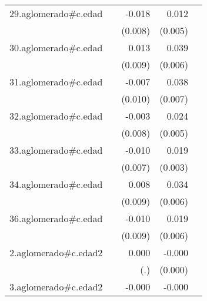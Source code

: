 {\begin{longtable}{l*{4}{D{.}{.}{-1}}}
\addlinespace
29.aglomerado#c.edad&                     &      -0.018\sym{*}  &       0.012\sym{*}  &                     \\
            &                     &     (0.008)         &     (0.005)         &                     \\
\addlinespace
30.aglomerado#c.edad&                     &       0.013         &       0.039\sym{***}&                     \\
            &                     &     (0.009)         &     (0.006)         &                     \\
\addlinespace
31.aglomerado#c.edad&                     &      -0.007         &       0.038\sym{***}&                     \\
            &                     &     (0.010)         &     (0.007)         &                     \\
\addlinespace
32.aglomerado#c.edad&                     &      -0.003         &       0.024\sym{***}&                     \\
            &                     &     (0.008)         &     (0.005)         &                     \\
\addlinespace
33.aglomerado#c.edad&                     &      -0.010         &       0.019\sym{***}&                     \\
            &                     &     (0.007)         &     (0.003)         &                     \\
\addlinespace
34.aglomerado#c.edad&                     &       0.008         &       0.034\sym{***}&                     \\
            &                     &     (0.009)         &     (0.006)         &                     \\
\addlinespace
36.aglomerado#c.edad&                     &      -0.010         &       0.019\sym{**} &                     \\
            &                     &     (0.009)         &     (0.006)         &                     \\
\addlinespace
2.aglomerado#c.edad2&                     &       0.000         &      -0.000\sym{**} &                     \\
            &                     &         (.)         &     (0.000)         &                     \\
\addlinespace
3.aglomerado#c.edad2&                     &      -0.000         &      -0.000\sym{***}&                     \\

\end{longtable}}
